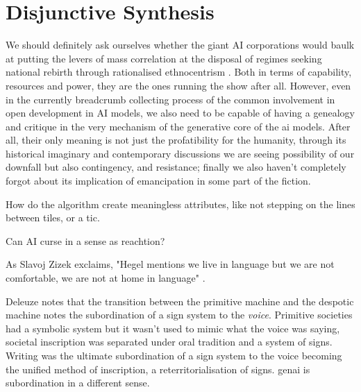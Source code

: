\chapter{Disjunctive Synthesis}


We should definitely ask ourselves whether the giant AI corporations would baulk at putting the levers of mass correlation at the disposal of regimes seeking national rebirth through rationalised ethnocentrism \parencite[]{mcquillan2019}. Both in terms of capability, resources and power, they are the ones running the show after all. However, even in the currently breadcrumb collecting process of the common involvement in open development in AI models, we also need to be capable of having a genealogy and critique in the very mechanism of the generative core of the \gls{ai} models. After all, their only meaning is not just the profatibility for the humanity, through its historical imaginary and contemporary discussions we are seeing possibility of our downfall but also contingency, and resistance; finally we also haven't completely forgot about its implication of emancipation in some part of the fiction.

How do the algorithm create meaningless attributes, like not stepping on the
lines between tiles, or a tic.

Can AI curse in a sense as reachtion?

As Slavoj Zizek exclaims, "Hegel mentions we live in language but we are not comfortable, we are not at
home in language" \parencite{berggrueninstitute2025} .

Deleuze notes that the transition between the primitive machine and the
despotic machine notes the subordination of a sign system to the
\textit{voice}.
Primitive societies had a symbolic system but it wasn't used to
mimic what the voice was saying, societal inscription was separated under oral
tradition and a system of signs. Writing was the ultimate subordination of a
sign system to the voice becoming the unified method of inscription, a
reterritorialisation of signs. \gls{genai} is subordination in a different
sense.
%
